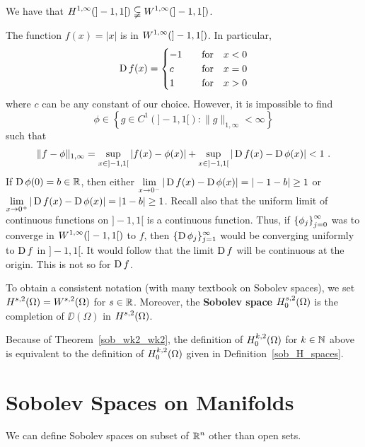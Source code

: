 \begin{egg}
We have that
$\displaystyle H^{1,\infty}(]-1,1[) \subsetneqq W^{1,\infty}(]-1,1[)$.

The function $f(x) = |x|$ is in $\displaystyle W^{1,\infty}(]-1,1[)$.
In particular,
\[
\operatorname{D} f(x) =
\begin{cases}
-1 & \quad \text{for} \quad x <0 \\
c & \quad \text{for} \quad x =0 \\
1 & \quad \text{for} \quad x >0 \\
\end{cases}
\]
where $c$ can be any constant of our choice.  However, it is
impossible to find
\[
\phi \in
\left\{ g \in C^1(]-1,1[) :  \|g\|_{1,\infty} < \infty \right\}
\]
such that
\[
\| f- \phi \|_{1,\infty} = \sup_{x\in]-1,1[} |f(x)-\phi(x)|
+ \sup_{x\in]-1,1[} |\operatorname{D} f(x)-\operatorname{D} \phi(x)| < 1 \  .
\]
If $\operatorname{D} \phi(0)=b \in \mathbb{R}$, then either
$\displaystyle \lim_{x\rightarrow 0^-}|\operatorname{D} f(x)-\operatorname{D} \phi(x)|
= |-1-b| \geq 1$ or
$\displaystyle \lim_{x\rightarrow 0^+}|\operatorname{D} f(x)-\operatorname{D} \phi(x)| =|1-b| \geq 1$.
Recall also that the uniform limit of continuous functions on
$]-1,1[$ is a continuous function.  Thus, if
$\displaystyle \left\{\phi_j\right\}_{j=0}^\infty$ was to converge in
$\displaystyle W^{1,\infty}(]-1,1[)$ to $f$, then
$\displaystyle \{\operatorname{D} \phi_j\}_{j=1}^\infty$ would be converging
uniformly to $\operatorname{D} f$ in $]-1,1[$.  It would follow that the limit
$\operatorname{D} f$ will be continuous at the origin.  This is not so for $\operatorname{D} f$.
\end{egg}

\begin{defn}
To obtain a consistent notation (with many textbook on Sobolev spaces), we set
$\displaystyle H^{s,2}(\Omega) = W^{s,2}(\Omega)$ for $s \in \mathbb{R}$.
Moreover, the {\bfseries Sobolev space}
$\displaystyle H^{s,2}_0(\Omega)$ is the completion of
$\DD(\Omega)$ in $\displaystyle H^{s,2}(\Omega)$.
\end{defn}

Because of Theorem~\ref{sob_wk2_wk2}, the definition of 
$\displaystyle H^{k,2}_0(\Omega)$ for $k \in \mathbb{N}$ above is equivalent
to the definition of $\displaystyle H^{k,2}_0(\Omega)$ given in
Definition~\ref{sob_H_spaces}.

\section{Sobolev Spaces on Manifolds}

We can define Sobolev spaces on subset of $\displaystyle \mathbb{R}^n$ other
than open sets.

